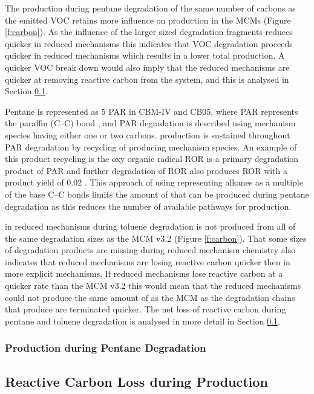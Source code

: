The  production during pentane degradation of the same number of carbons as the emitted VOC retains more influence on  production in the MCMs (Figure \ref{f:carbon}).
As the influence of the larger sized degradation fragments reduces quicker in reduced mechanisms this indicates that VOC degradation proceeds quicker in reduced mechanisms which results in a lower total  production.
A quicker VOC break down would also imply that the reduced mechanisms are quicker at removing reactive carbon from the system, and this is analysed in Section \ref{ss:carbon_loss}.

Pentane is represented as $5$ PAR in CBM-IV and CB05, where PAR represents the paraffin (C--C) bond \citep{Gery:1989, Yarwood:2005}, and PAR degradation is described using mechanism species having either one or two carbons.
 production is sustained throughout PAR degradation by recycling of  producing mechanism species.
An example of this product recycling is the oxy organic radical ROR is a primary degradation product of PAR and further degradation of ROR also produces ROR with a product yield of $0.02$ \citep{Gery:1989}.
This approach of using representing alkanes as a multiple of the base C--C bonds limits the amount of  that can be produced during pentane degradation as this reduces the number of available pathways for  production.

 in reduced mechanisms during toluene degradation is not produced from all of the same degradation sizes as the MCM v3.2 (Figure \ref{f:carbon}).
That some sizes of degradation products are missing during reduced mechanism chemistry also indicates that reduced mechanisms are losing reactive carbon quicker then in more explicit mechanisms.
If reduced mechanisms lose reactive carbon at a quicker rate than the MCM v3.2 this would mean that the reduced mechanisms could not produce the same amount of  as the MCM as the degradation chains that produce  are terminated quicker.
The net loss of reactive carbon during pentane and toluene degradation is analysed in more detail in Section \ref{ss:carbon_loss}.

\subsubsection[Ox Production during Pentane Degradation]{ Production during Pentane Degradation} \label{sss:alkanes}

\subsection[Reactive Carbon Loss during Ox Production]{Reactive Carbon Loss during  Production} \label{ss:carbon_loss}

